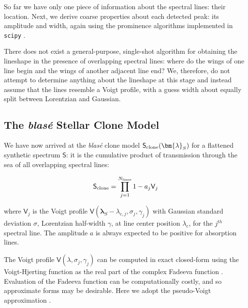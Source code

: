 \documentclass[trackchanges]{aastex631}
\begin{document}
So far we have only one piece of information about the spectral lines: their location. Next, we derive coarse properties about each detected peak: its amplitude and width, again using the prominence algorithms implemented in \texttt{scipy} \citep{2020SciPy-NMeth}.

There does not exist a general-purpose, single-shot algorithm for obtaining the lineshape in the presence of overlapping spectral lines: where do the wings of one line begin and the wings of another adjacent line end? We, therefore, do not attempt to determine anything about the lineshape at this stage and instead assume that the lines resemble a Voigt profile, with a guess width about equally split between Lorentzian and Gaussian.

\subsection{The \emph{blas\'e} Stellar Clone Model}

We have now arrived at the \emph{blas\'e} clone model $\mathsf{S}_{\rm clone}(\bm{\lambda}_S)$ for a flattened synthetic spectrum $\mathsf{S}$: it is the cumulative product of transmission through the sea of all overlapping spectral lines:

\begin{eqnarray}
    \mathsf{S}_{\rm clone} = {\displaystyle \prod_{j=1}^{N_{\mathrm{lines}}} 1-a_j \mathsf{V}_j } \label{equation1}
\end{eqnarray}

\noindent where $\mathsf{V}_j$ is the Voigt profile $\mathsf{V}(\bm{\lambda}_S-\lambda_{\mathrm{c},j}, \sigma_j, \gamma_j)$ with Gaussian standard deviation $\sigma$, Lorentzian half-width $\gamma$, at line center position $\lambda_c$, for the $j^{th}$ spectral line. The amplitude $a$ is always expected to be positive for absorption lines.

The Voigt profile $\mathsf{V}(\lambda, \sigma_j, \gamma_j)$ can be computed in exact closed-form using the Voigt-Hjerting function \citep{1938ApJ....88..508H} as the real part of the complex Fadeeva function \citep[\emph{e.g.}][]{2011arXiv1106.0151Z}. Evaluation of the Fadeeva function can be computationally costly, and so approximate forms may be desirable. Here we adopt the pseudo-Voigt approximation \citep{Ida:nt0146}.
\end{document}
